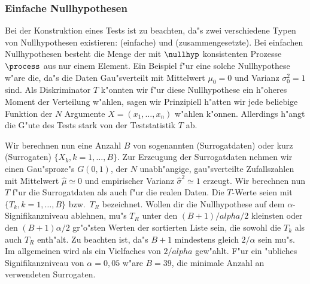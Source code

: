 \subsubsection{Einfache Nullhypothesen}
Bei der Konstruktion eines Tests ist zu beachten, da"s zwei verschiedene Typen von
Nullhypothesen existieren: \begriff(einfache) und \begriff(zusammengesetzte). Bei
einfachen Nullhypothesen besteht die Menge der mit $\nullhyp$ konsistenten Prozesse
$\process$ aus nur einem Element. Ein Beispiel f"ur eine solche Nullhypothese w"are die,
da"s die Daten Gau"sverteilt mit Mittelwert $\mu_0=0$ und Varianz $\sigma_0^2=1$ sind. Als Diskriminator
$T$ k"onnten wir f"ur diese Nullhypothese ein h"oheres Moment der Verteilung w"ahlen, sagen
wir 
Prinzipiell h"atten wir jede beliebige Funktion der $N$ Argumente $X=(x_1,\dots,x_n) $ 
w"ahlen k"onnen. Allerdings h"angt die G"ute des Tests stark von der Teststatistik $T$ ab\footnotemark.


Wir berechnen nun eine Anzahl $B$ von sogenannten \begriff(Surrogatdaten) oder kurz
\begriff(Surrogaten) $\{X_k, k=1,\dots,B\}$. Zur Erzeugung der Surrogatdaten nehmen wir
einen Gau"sproze"s $G(0,1)$, der $N$ unabh"angige, gau"sverteilte Zufallszahlen mit
Mittelwert $\hat\mu\simeq 0$ und empirischer Varianz $\hat\sigma^2\simeq 1$
erzeugt\footnotemark. Wir berechnen nun $T$ f"ur die Surrogatdaten als auch f"ur die
realen Daten. Die $T$-Werte seien mit $\{T_k,k=1,\dots,B\}$ bzw.\ $T_R$ bezeichnet. Wollen
dir die Nullhypothese auf dem $\alpha$-Signifikanzniveau ablehnen, mu"s $T_R$ unter den
$(B+1)/alpha/2$ kleinsten oder den $(B+1)\alpha/2$ gr"o"sten Werten der sortierten Liste
sein, die sowohl die $T_k$ als auch $T_R$ enth"alt\footnotemark. Zu beachten ist, da"s
$B+1$ mindestens gleich $2/\alpha$ sein mu"s. Im allgemeinen wird als ein Vielfaches von
$2/alpha$ gew"ahlt. F"ur ein "ubliches Signifikanzniveau von $\alpha=0,05$ w"are $B=39$,
die minimale Anzahl an verwendeten Surrogaten.    

